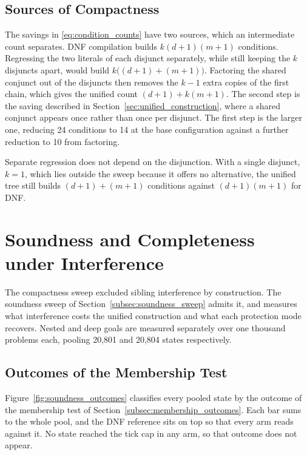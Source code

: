     \subsection{Sources of Compactness}
    \label{subsec:compactness_sources}
    The savings in \eqref{eq:condition_counts} have two sources, which an intermediate count separates.
    DNF compilation builds $k(d+1)(m+1)$ conditions.
    Regressing the two literals of each disjunct separately, while still keeping the $k$ disjuncts apart, would build $k\bigl((d+1) + (m+1)\bigr)$.
    Factoring the shared conjunct out of the disjuncts then removes the $k - 1$ extra copies of the first chain, which gives the unified count $(d+1) + k(m+1)$.
    The second step is the saving described in Section~\ref{sec:unified_construction}, where a shared conjunct appears once rather than once per disjunct.
    The first step is the larger one, reducing 24 conditions to 14 at the base configuration against a further reduction to 10 from factoring.

    Separate regression does not depend on the disjunction.
    With a single disjunct, $k = 1$, which lies outside the sweep because it offers no alternative, the unified tree still builds $(d+1) + (m+1)$ conditions against $(d+1)(m+1)$ for DNF.

\section{Soundness and Completeness under Interference}
\label{sec:results_interference}
    The compactness sweep excluded sibling interference by construction.
    The soundness sweep of Section~\ref{subsec:soundness_sweep} admits it, and measures what interference costs the unified construction and what each protection mode recovers.
    Nested and deep goals are measured separately over one thousand problems each, pooling 20,801 and 20,804 states respectively.

    \subsection{Outcomes of the Membership Test}
    \label{subsec:interference_outcomes}

    

    Figure~\ref{fig:soundness_outcomes} classifies every pooled state by the outcome of the membership test of Section~\ref{subsec:membership_outcomes}.
    Each bar sums to the whole pool, and the DNF reference sits on top so that every arm reads against it.
    No state reached the tick cap in any arm, so that outcome does not appear.

